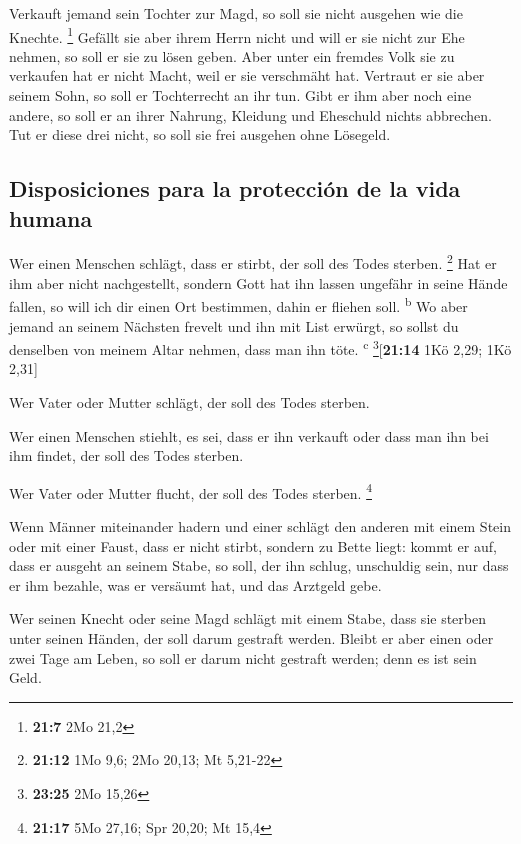  Verkauft jemand sein Tochter zur Magd, so soll sie nicht
ausgehen wie die Knechte. \footnote{\textbf{21:7} 2Mo 21,2}
 Gefällt sie aber ihrem Herrn nicht und will er sie nicht
zur Ehe nehmen, so soll er sie zu lösen geben. Aber unter ein fremdes
Volk sie zu verkaufen hat er nicht Macht, weil er sie verschmäht hat.
 Vertraut er sie aber seinem Sohn, so soll er Tochterrecht
an ihr tun.  Gibt er ihm aber noch eine andere, so soll
er an ihrer Nahrung, Kleidung und Eheschuld nichts abbrechen.
 Tut er diese drei nicht, so soll sie frei ausgehen ohne
Lösegeld.

\hypertarget{disposiciones-para-la-protecciuxf3n-de-la-vida-humana}{%
\subsection{Disposiciones para la protección de la vida
humana}\label{disposiciones-para-la-protecciuxf3n-de-la-vida-humana}}

 Wer einen Menschen schlägt, dass er stirbt, der soll des
Todes sterben. \footnote{\textbf{21:12} 1Mo 9,6; 2Mo 20,13; Mt 5,21-22}
 Hat er ihm aber nicht nachgestellt, sondern Gott hat ihn
lassen ungefähr in seine Hände fallen, so will ich dir einen Ort
bestimmen, dahin er fliehen soll. \textsuperscript{b}  Wo
aber jemand an seinem Nächsten frevelt und ihn mit List erwürgt, so
sollst du denselben von meinem Altar nehmen, dass man ihn töte.
\textsuperscript{c} \footnote{\textbf{23:25} 2Mo 15,26}{[}\textbf{21:14}
1Kö 2,29; 1Kö 2,31{]}

 Wer Vater oder Mutter schlägt, der soll des Todes
sterben.

 Wer einen Menschen stiehlt, es sei, dass er ihn verkauft
oder dass man ihn bei ihm findet, der soll des Todes sterben.

 Wer Vater oder Mutter flucht, der soll des Todes
sterben. \footnote{\textbf{21:17} 5Mo 27,16; Spr 20,20; Mt 15,4}

 Wenn Männer miteinander hadern und einer schlägt den
anderen mit einem Stein oder mit einer Faust, dass er nicht stirbt,
sondern zu Bette liegt:  kommt er auf, dass er ausgeht an
seinem Stabe, so soll, der ihn schlug, unschuldig sein, nur dass er ihm
bezahle, was er versäumt hat, und das Arztgeld gebe.

 Wer seinen Knecht oder seine Magd schlägt mit einem
Stabe, dass sie sterben unter seinen Händen, der soll darum gestraft
werden.  Bleibt er aber einen oder zwei Tage am Leben, so
soll er darum nicht gestraft werden; denn es ist sein Geld.

